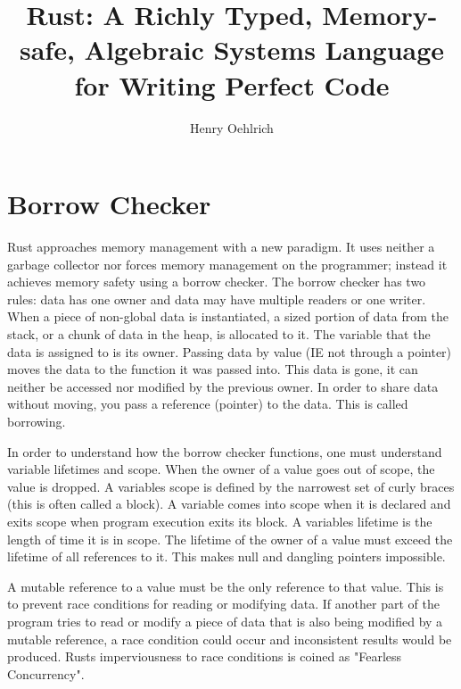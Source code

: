 \documentclass{article}
\title{Rust: A Richly Typed, Memory-safe, Algebraic Systems Language for Writing Perfect Code}
\author{Henry Oehlrich}
\begin{document}
\maketitle{}

\section{Borrow Checker}

Rust approaches memory management with a new paradigm. It uses neither a
garbage collector nor forces memory management on the programmer; instead it
achieves memory safety using a borrow checker. The borrow checker has two
rules: data has one owner and data may have multiple readers or one writer.
When a piece of non-global data is instantiated, a sized portion of data from
the stack, or a chunk of data in the heap, is allocated to it. The variable
that the data is assigned to is its owner. Passing data by value (IE not
through a pointer) moves the data to the function it was passed into. This data
is gone, it can neither be accessed nor modified by the previous owner. In
order to share data without moving, you pass a reference (pointer) to the data.
This is called borrowing. 

In order to understand how the borrow checker functions, one must understand
variable lifetimes and scope. When the owner of a value goes out of scope, the
value is dropped. A variables scope is defined by the narrowest set of curly
braces (this is often called a block). A variable comes into scope when it is
declared and exits scope when program execution exits its block. A variables
lifetime is the length of time it is in scope. The lifetime of the owner of a
value must exceed the lifetime of all references to it. This makes null and
dangling pointers impossible.

A mutable reference to a value must be the only reference to that value. This
is to prevent race conditions for reading or modifying data. If another part of
the program tries to read or modify a piece of data that is also being modified
by a mutable reference, a race condition could occur and inconsistent results
would be produced. Rusts imperviousness to race conditions is coined as
"Fearless Concurrency". 

\cite{rustforrustaceans} \\
\cite{rust-lang.org} \\
\cite{rust-by-example} \\
\cite{the-c-programming-language} \\
\cite{noboilerplate}


 
\end{document}

